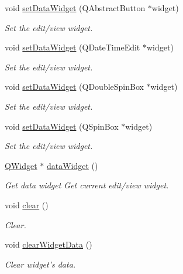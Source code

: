\begin{DoxyCompactItemize}
void \hyperlink{classmdt_sql_field_handler_aa9a60be66471371ff52eb2a95989feba}{set\-Data\-Widget} (Q\-Abstract\-Button $\ast$widget)
\begin{DoxyCompactList}\small\item\em Set the edit/view widget. \end{DoxyCompactList}\item 
void \hyperlink{classmdt_sql_field_handler_abb528a4e0245d12308870556eefc934a}{set\-Data\-Widget} (Q\-Date\-Time\-Edit $\ast$widget)
\begin{DoxyCompactList}\small\item\em Set the edit/view widget. \end{DoxyCompactList}\item 
void \hyperlink{classmdt_sql_field_handler_a080380d84da12132783a8de9ad9fdf4c}{set\-Data\-Widget} (Q\-Double\-Spin\-Box $\ast$widget)
\begin{DoxyCompactList}\small\item\em Set the edit/view widget. \end{DoxyCompactList}\item 
void \hyperlink{classmdt_sql_field_handler_a13a1e634bdb0d5c85ab1198aa09a64e2}{set\-Data\-Widget} (Q\-Spin\-Box $\ast$widget)
\begin{DoxyCompactList}\small\item\em Set the edit/view widget. \end{DoxyCompactList}\item 
\hyperlink{class_q_widget}{Q\-Widget} $\ast$ \hyperlink{classmdt_sql_field_handler_a91ab8160d5015b6030e7169ab7108d33}{data\-Widget} ()
\begin{DoxyCompactList}\small\item\em Get data widget Get current edit/view widget. \end{DoxyCompactList}\item 
void \hyperlink{classmdt_sql_field_handler_a10467d49304f7bc0c75e280098e3e0bc}{clear} ()
\begin{DoxyCompactList}\small\item\em Clear. \end{DoxyCompactList}\item 
void \hyperlink{classmdt_sql_field_handler_ad482be9d476c3310373078a6cd949714}{clear\-Widget\-Data} ()
\begin{DoxyCompactList}\small\item\em Clear widget's data. \end{DoxyCompactList}\item 

\end{DoxyCompactItemize}
